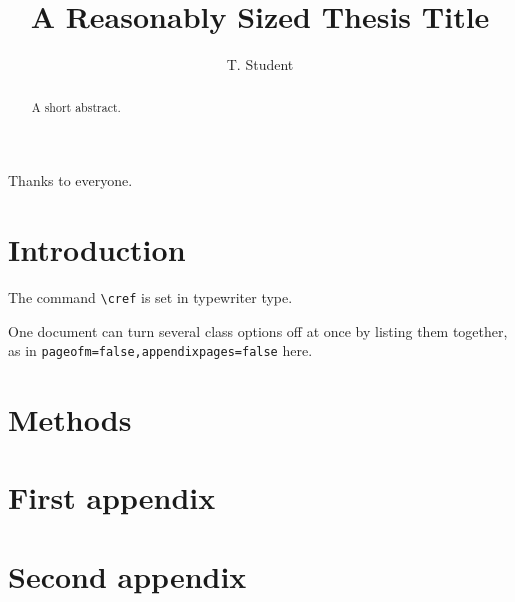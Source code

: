 \documentclass[phd,appendixpages=false,12pt,a4paper]{bangor}
\title{A Reasonably Sized Thesis Title}
\author{T. Student}
\begin{document}
\maketitle
\begin{acknowledgements}
  Thanks to everyone.
\end{acknowledgements}
\begin{abstract}
  A short abstract.
\end{abstract}
\tableofcontents
\chapter{Introduction}
The command \texttt{\textbackslash cref} is set in typewriter type.

One document can turn several class options off at once by listing them together, as in \texttt{pageofm=false,appendixpages=false} here.
\chapter{Methods}
\appendix
\chapter{First appendix}
\chapter{Second appendix}
\end{document}
